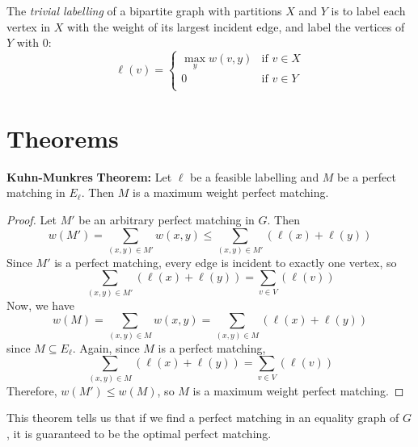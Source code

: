 \documentclass[12pt]{article}
\newcommand{\thm}{\noindent \textbf{Theorem: }}
\newcommand{\lskip}{\vspace{\baselineskip}}
\begin{document}
\noindent The \emph{trivial labelling} of a bipartite graph with partitions $X$ and $Y$ is to label each vertex in $X$ with the weight of its largest incident edge, and label the vertices of $Y$ with 0:
\[ \ell(v) =
  \begin{cases}
    \max_{y} w(v,y) & \text{if } v \in X \\
    0 & \text{if } v \in Y \\
  \end{cases}
\]

\section*{Theorems}

\textbf{Kuhn-Munkres} \thm Let $\ell$ be a feasible labelling and $M$ be a perfect matching in $E_\ell$. Then $M$ is a maximum weight perfect matching.

\begin{proof}
  Let $M'$ be an arbitrary perfect matching in $G$. Then
  \[ w(M') = \sum_{(x,y) \in M'} w(x,y) \leq \sum_{(x,y) \in M'}(\ell(x) + \ell(y)) \]
  Since $M'$ is a perfect matching, every edge is incident to exactly one vertex, so \[ \sum_{(x,y) \in M'}(\ell(x) + \ell(y)) = \sum_{v \in V}(\ell(v)) \]
  Now, we have
  \[ w(M) = \sum_{(x,y) \in M} w(x,y) = \sum_{(x,y) \in M}(\ell(x) + \ell(y)) \]
  since $M \subseteq E_\ell$.
  Again, since $M$ is a perfect matching,
  \[ \sum_{(x,y) \in M}(\ell(x) + \ell(y)) = \sum_{v \in V}(\ell(v)) \]
  Therefore, $w(M') \leq w(M)$, so $M$ is a maximum weight perfect matching.
\end{proof}

This theorem tells us that if we find a perfect matching in an equality graph of $G$, it is guaranteed to be the optimal perfect matching.\lskip
\lskip
\end{document}
